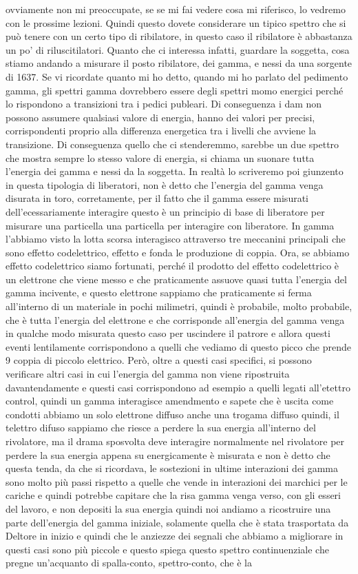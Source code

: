ovviamente non mi preoccupate, se se mi fai vedere cosa mi riferisco, lo vedremo con le prossime lezioni. Quindi questo dovete considerare un tipico spettro che si può tenere con un certo tipo di ribilatore, in questo caso il ribilatore è abbastanza un po' di riluscitilatori. Quanto che ci interessa infatti, guardare la soggetta, cosa stiamo andando a misurare il posto ribilatore, dei gamma, e nessi da una sorgente di 1637. Se vi ricordate quanto mi ho detto, quando mi ho parlato del pedimento gamma, gli spettri gamma dovrebbero essere degli spettri momo energici perché lo rispondono a transizioni tra i pedici publeari. Di conseguenza i dam non possono assumere qualsiasi valore di energia, hanno dei valori per precisi, corrispondenti proprio alla differenza energetica tra i livelli che avviene la transizione. Di conseguenza quello che ci stenderemmo, sarebbe un due spettro che mostra sempre lo stesso valore di energia, si chiama un suonare tutta l'energia dei gamma e nessi da la soggetta. In realtà lo scriveremo poi giunzento in questa tipologia di liberatori, non è detto che l'energia del gamma venga disurata in toro, corretamente, per il fatto che il gamma essere misurati dell'ecessariamente interagire questo è un principio di base di liberatore per misurare una particella una particella per interagire con liberatore. In gamma l'abbiamo visto la lotta scorsa interagisco attraverso tre meccanini principali che sono effetto codelettrico, effetto e fonda le produzione di coppia. Ora, se abbiamo effetto codelettrico siamo fortunati, perché il prodotto del effetto codelettrico è un elettrone che viene messo e che praticamente assuove quasi tutta l'energia del gamma incivente, e questo elettrone sappiamo che praticamente si ferma all'interno di un materiale in pochi milimetri, quindi è probabile, molto probabile, che è tutta l'energia del elettrone e che corrisponde all'energia del gamma venga in qualche modo misurata questo caso per uscindere il patrore e allora questi eventi lentilamente corrispondono a quelli che vediamo di questo picco che prende 9 coppia di piccolo elettrico. Però, oltre a questi casi specifici, si possono verificare altri casi in cui l'energia del gamma non viene ripostruita davantendamente e questi casi corrispondono ad esempio a quelli legati all'etettro control, quindi un gamma interagisce amendmento e sapete che è uscita come condotti abbiamo un solo elettrone diffuso anche una trogama diffuso quindi, il telettro difuso sappiamo che riesce a perdere la sua energia all'interno del rivolatore, ma il drama sposvolta deve interagire normalmente nel rivolatore per perdere la sua energia appena su energicamente è misurata e non è detto che questa tenda, da che si ricordava, le sostezioni in ultime interazioni dei gamma sono molto più passi rispetto a quelle che vende in interazioni dei marchici per le cariche e quindi potrebbe capitare che la risa gamma venga verso, con gli esseri del lavoro, e non depositi la sua energia quindi noi andiamo a ricostruire una parte dell'energia del gamma iniziale, solamente quella che è stata trasportata da Deltore in inizio e quindi che le anziezze dei segnali che abbiamo a migliorare in questi casi sono più piccole e questo spiega questo spettro continuenziale che pregne un'acquanto di spalla-conto, spettro-conto, che è la 
